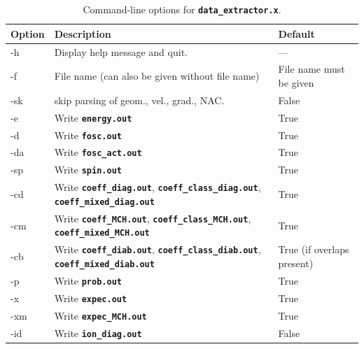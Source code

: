 \documentclass[a4paper,10pt,DIV=15,openany]{scrbook}
\newcommand{\ttt}[1]{\textbf{\texttt{#1}}}
\begin{document}
\clearpage

\begin{table}[h]
  \centering
  \caption{Command-line options for \ttt{data\_extractor.x}.}
  \label{tab:dataextractor_options}
  \begin{tabular}{>{\ttfamily}lll}
    \hline
    \rmfamily Option        &Description      &Default\\
    \hline
    -h          &Display help message and quit.                         &---                      \\
    -f          &File name (can also be given without file name)        &File name must be given  \\
    -sk         &skip parsing of geom., vel., grad., NAC.               &False                    \\
    \hline
    -e          &Write \ttt{energy.out}                                 &True                     \\
    -d          &Write \ttt{fosc.out}                                   &True                     \\
    -da         &Write \ttt{fosc\_act.out}                              &True                     \\
    -sp         &Write \ttt{spin.out}                                   &True                     \\
    -cd         &Write \ttt{coeff\_diag.out}, 
                       \ttt{coeff\_class\_diag.out}, 
                       \ttt{coeff\_mixed\_diag.out}                     &True                     \\
    -cm         &Write \ttt{coeff\_MCH.out}, 
                       \ttt{coeff\_class\_MCH.out}, 
                       \ttt{coeff\_mixed\_MCH.out}                      &True                     \\
    -cb         &Write \ttt{coeff\_diab.out}, 
                       \ttt{coeff\_class\_diab.out}, 
                       \ttt{coeff\_mixed\_diab.out}                     &True (if overlaps present) \\
    -p          &Write \ttt{prob.out}                                   &True                     \\
    -x          &Write \ttt{expec.out}                                  &True                     \\
    -xm         &Write \ttt{expec\_MCH.out}                             &True                     \\
    -id         &Write \ttt{ion\_diag.out}                              &False                    \\

\end{tabular}
\end{table}
\end{document}
